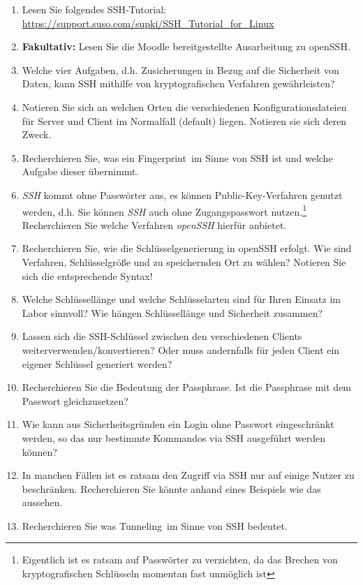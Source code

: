 \documentclass[paper=a4,fontsize=11pt]{scrartcl}%
\numberwithin{equation}{section}
\begin{document}
	\begin{enumerate}
		\item Lesen Sie folgendes SSH-Tutorial: \url{https://support.suso.com/supki/SSH_Tutorial_for_Linux}
		\item \textbf{Fakultativ:} Lesen Sie die Moodle bereitgestellte Ausarbeitung zu openSSH.
		\item Welche vier Aufgaben, d.h. Zusicherungen in Bezug auf die Sicherheit von Daten, kann SSH mithilfe von kryptografischen Verfahren gewährleisten?	
		\item Notieren Sie sich an welchen Orten die verschiedenen Konfigurationsdateien für Server und Client im Normalfall (default) liegen. Notieren sie sich deren Zweck.
		\item Recherchieren Sie, was ein \glqq Fingerprint\grqq\ im Sinne von SSH ist und welche Aufgabe dieser übernimmt. 
		\item \emph{SSH} kommt ohne Passwörter aus, es können Public-Key-Verfahren genutzt werden, d.h. Sie können \emph{SSH} auch ohne Zugangspasswort nutzen.\footnote{Eigentlich ist es ratsam auf Passwörter zu verzichten, da das Brechen von kryptografischen Schlüsseln momentan fast unmöglich ist} Recherchieren Sie welche Verfahren \emph{openSSH} hierfür anbietet.
		\item Recherchieren Sie, wie die Schlüsselgenerierung in openSSH erfolgt. Wie sind Verfahren, Schlüsselgröße und zu speichernden Ort zu wählen? Notieren Sie sich die entsprechende Syntax!
		\item Welche Schlüssellänge und welche Schlüsselarten sind für Ihren Einsatz im Labor sinnvoll? Wie hängen Schlüssellänge und Sicherheit zusammen?
		\item Lassen sich die SSH-Schlüssel zwischen den verschiedenen Clients weiterverwenden/konvertieren? Oder muss andernfalls für jeden Client ein eigener Schlüssel generiert werden?
		\item Recherchieren Sie die Bedeutung der Passphrase. Ist die Passphrase mit dem Passwort gleichzusetzen?
		\item Wie kann aus Sicherheitsgründen ein Login ohne Passwort eingeschränkt werden, so das nur bestimmte Kommandos via SSH ausgeführt werden können?
		\item In manchen Fällen ist es ratsam den Zugriff via SSH nur auf einige Nutzer zu beschränken. Recherchieren Sie könnte anhand eines Beispiels wie das aussehen.
		\item Recherchieren Sie was \glqq Tunneling\grqq\ im Sinne von SSH bedeutet.
	\end{enumerate}
	
\end{document}

